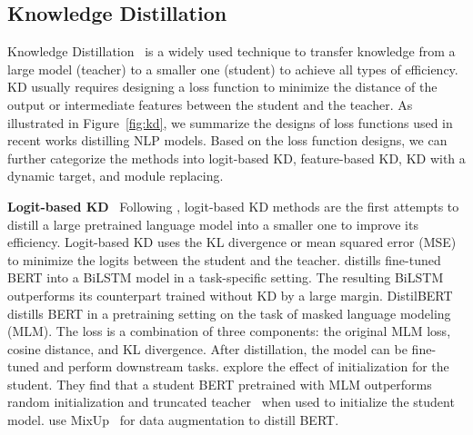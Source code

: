 \documentclass[letterpaper]{article}
\newcommand{\paratitle}[1]{\noindent\textbf{#1}\ }
\begin{document}
\subsection{Knowledge Distillation}
Knowledge Distillation~\citep{hinton2015distilling} is a widely used technique to transfer knowledge from a large model (teacher) to a smaller one (student) to achieve all types of efficiency. KD usually requires designing a loss function to minimize the distance of the output or intermediate features between the student and the teacher. As illustrated in Figure~\ref{fig:kd}, we summarize the designs of loss functions used in recent works distilling NLP models. Based on the loss function designs, we can further categorize the methods into logit-based KD, feature-based KD, KD with a dynamic target, and module replacing.

\paratitle{Logit-based KD} Following \citet{hinton2015distilling}, logit-based KD methods are the first attempts to distill a large pretrained language model into a smaller one to improve its efficiency. Logit-based KD uses the KL divergence or mean squared error (MSE) to minimize the logits between the student and the teacher. \citet{tang2019distilling} distills fine-tuned BERT into a BiLSTM model in a task-specific setting. The resulting BiLSTM outperforms its counterpart trained without KD by a large margin. DistilBERT~\citep{sanh2019distilbert} distills BERT in a pretraining setting on the task of masked language modeling (MLM). The loss is a combination of three components: the original MLM loss, cosine distance, and KL divergence. After distillation, the model can be fine-tuned and perform downstream tasks. \citet{turc2019well} explore the effect of initialization for the student. They find that a student BERT pretrained with MLM outperforms random initialization and truncated teacher~\citep{sanh2019distilbert,pkd} when used to initialize the student model. \citet{mixkd} use MixUp~\citep{mixup} for data augmentation to distill BERT.
\end{document}
